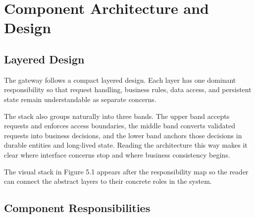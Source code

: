 \chapter{Component Architecture and Design}

\section{Layered Design}

The gateway follows a compact layered design. Each layer has one dominant
responsibility so that request handling, business rules, data access, and
persistent state remain understandable as separate concerns.

The stack also groups naturally into three bands. The upper band accepts
requests and enforces access boundaries, the middle band converts validated
requests into business decisions, and the lower band anchors those decisions in
durable entities and long-lived state. Reading the architecture this way makes
it clear where interface concerns stop and where business consistency begins.

The visual stack in Figure 5.1 appears after the responsibility map so the
reader can connect the abstract layers to their concrete roles in the system.

\section{Component Responsibilities}


